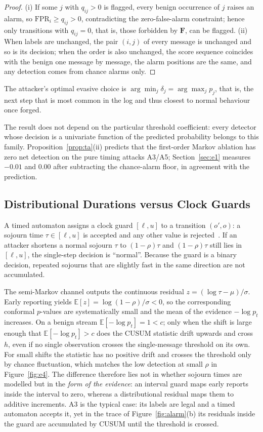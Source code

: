 \documentclass[manuscript,screen,review]{acmart}
\begin{document}
\begin{proof}
(i) If some $j$ with $q_{ij}>0$ is flagged, every benign occurrence of $j$ raises an alarm, so $\mathrm{FPR}_i\ge q_{ij}>0$, contradicting the zero-false-alarm constraint; hence only transitions with $q_{ij}=0$, that is, those forbidden by $\mathbf F$, can be flagged. (ii) When labels are unchanged, the pair $(i,j)$ of every message is unchanged and so is its decision; when the order is also unchanged, the score sequence coincides with the benign one message by message, the alarm positions are the same, and any detection comes from chance alarms only.
\end{proof}

The attacker's optimal evasive choice is $\arg\min_j\delta_j=\arg\max_j p_j$, that is, the next step that is most common in the log and thus closest to normal behaviour once forged.

The result does not depend on the particular threshold coefficient: every detector whose decision is a univariate function of the predicted probability belongs to this family. Proposition~\ref{prop:ta}(ii) predicts that the first-order Markov ablation has zero net detection on the pure timing attacks {A3}/{A5}; Section~\ref{sec:e1} measures $-0.01$ and $0.00$ after subtracting the chance-alarm floor, in agreement with the prediction.

\subsection{Distributional Durations versus Clock Guards}
\label{sec:md}

A timed automaton assigns a clock guard $[\ell,u]$ to a transition $(o',o)$: a sojourn time $\tau\in[\ell,u]$ is accepted and any other value is rejected~\cite{maier2011timed,lin2018tabor}. If an attacker shortens a normal sojourn $\tau$ to $(1-\rho)\tau$ and $(1-\rho)\tau$ still lies in $[\ell,u]$, the single-step decision is ``normal''. Because the guard is a binary decision, repeated sojourns that are slightly fast in the same direction are not accumulated.

The semi-Markov channel outputs the continuous residual $z=(\log\tau-\mu)/\sigma$. Early reporting yields $\mathbb{E}[z]=\log(1-\rho)/\sigma<0$, so the corresponding conformal $p$-values are systematically small and the mean of the evidence $-\log p_t$ increases. On a benign stream $\mathbb{E}[-\log p_t]=1<c$; only when the shift is large enough that $\mathbb{E}[-\log p_t]>c$ does the {CUSUM} statistic drift upwards and cross $h$, even if no single observation crosses the single-message threshold on its own. For small shifts the statistic has no positive drift and crosses the threshold only by chance fluctuation, which matches the low detection at small $\rho$ in Figure~\ref{fig:e4}. The difference therefore lies not in whether sojourn times are modelled but in the \emph{form of the evidence}: an interval guard maps early reports inside the interval to zero, whereas a distributional residual maps them to additive increments. {A3} is the typical case: its labels are legal and a timed automaton accepts it, yet in the trace of Figure~\ref{fig:alarm}(b) its residuals inside the guard are accumulated by {CUSUM} until the threshold is crossed.
\end{document}
